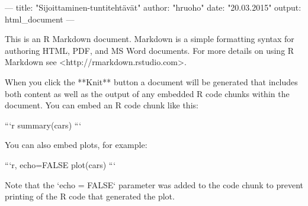 ---
title: "Sijoittaminen-tuntitehtävät"
author: "hruoho"
date: "20.03.2015"
output: html_document
---

This is an R Markdown document. Markdown is a simple formatting syntax for authoring HTML, PDF, and MS Word documents. For more details on using R Markdown see <http://rmarkdown.rstudio.com>.

When you click the **Knit** button a document will be generated that includes both content as well as the output of any embedded R code chunks within the document. You can embed an R code chunk like this:

```{r}
summary(cars)
```

You can also embed plots, for example:

```{r, echo=FALSE}
plot(cars)
```

Note that the `echo = FALSE` parameter was added to the code chunk to prevent printing of the R code that generated the plot.
